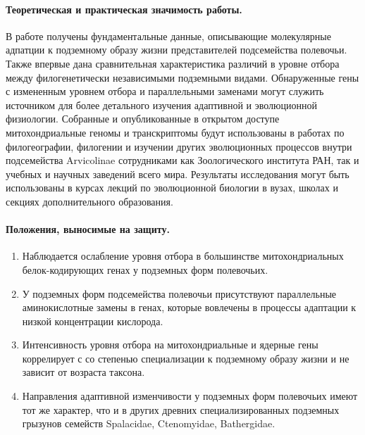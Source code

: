 \paragraph{Теоретическая и практическая значимость работы.} В работе получены фундаментальные данные, описывающие молекулярные адпатции к подземному образу жизни представителей подсемейства полевочьи. Также впервые дана сравнительная характеристика различий в уровне отбора между филогенетически независимыми подземными видами. Обнаруженные гены с измененным уровнем отбора и параллельными заменами могут служить источником для более детального изучения адаптивной и эволюционной физиологии. Собранные и опубликованные в открытом доступе митохондриальные геномы и транскриптомы будут использованы в работах по филогеографии, филогении и изучении других эволюционных процессов внутри подсемейства Arvicolinae сотрудниками как Зоологического института РАН, так и учебных и научных заведений всего мира. Результаты исследования могут быть использованы в курсах лекций по эволюционной биологии в вузах, школах и секциях дополнительного образования.

\paragraph{Положения, выносимые на защиту.}
\begin{enumerate}
	\item Наблюдается ослабление уровня отбора в большинстве митохондриальных белок-кодирующих генах у подземных форм полевочьих. 
	\item У подземных форм подсемейства полевочьи присутствуют параллельные аминокислотные замены в генах, которые вовлечены в процессы адаптации к низкой концентрации кислорода.
	\item Интенсивность уровня отбора на митохондриальные и ядерные гены коррелирует с со степенью специализации к подземному образу жизни и не зависит от возраста таксона.
	\item Направления адаптивной изменчивости у подземных форм полевочьих имеют тот же характер, что и в других древних специализированных подземных грызунов семейств Spalacidae, Ctenomyidae, Bathergidae.
\end{enumerate}

